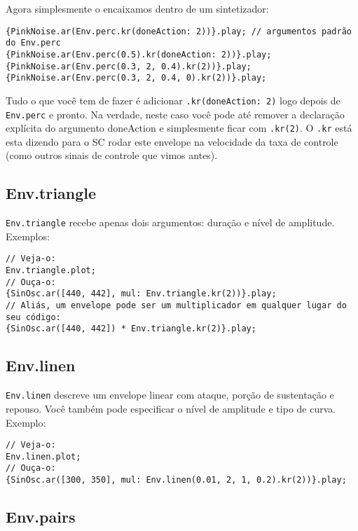 Agora simplesmente o encaixamos dentro de um sintetizador:

\begin{lstlisting}[style=SuperCollider-IDE, basicstyle=\scttfamily\footnotesize]
{PinkNoise.ar(Env.perc.kr(doneAction: 2))}.play; // argumentos padrão do Env.perc
{PinkNoise.ar(Env.perc(0.5).kr(doneAction: 2))}.play; 
{PinkNoise.ar(Env.perc(0.3, 2, 0.4).kr(2))}.play;
{PinkNoise.ar(Env.perc(0.3, 2, 0.4, 0).kr(2))}.play;
\end{lstlisting}
 
Tudo o que você tem de fazer é adicionar \texttt{.kr(doneAction: 2)} logo depois de \texttt{Env.perc} e pronto. Na verdade, neste caso você pode até remover a declaração explícita do argumento doneAction e simplesmente ficar com \texttt{.kr(2)}. O \texttt{.kr} está esta dizendo para o SC rodar este envelope na velocidade da taxa de controle (como outros sinais de controle que vimos antes).

\subsection{Env.triangle}

\texttt{Env.triangle} recebe apenas dois argumentos: duração e nível de amplitude. Exemplos:

 
\begin{lstlisting}[style=SuperCollider-IDE, basicstyle=\scttfamily\footnotesize]
// Veja-o:
Env.triangle.plot;
// Ouça-o:
{SinOsc.ar([440, 442], mul: Env.triangle.kr(2))}.play;
// Aliás, um envelope pode ser um multiplicador em qualquer lugar do seu código:
{SinOsc.ar([440, 442]) * Env.triangle.kr(2)}.play;
\end{lstlisting}

\subsection{Env.linen}

\texttt{Env.linen} descreve um envelope linear com ataque, porção de sustentação e repouso. Você também pode especificar o nível de amplitude e tipo de curva. Exemplo:

\begin{lstlisting}[style=SuperCollider-IDE, basicstyle=\scttfamily\footnotesize]
// Veja-o:
Env.linen.plot;
// Ouça-o:
{SinOsc.ar([300, 350], mul: Env.linen(0.01, 2, 1, 0.2).kr(2))}.play;
\end{lstlisting}

\subsection{Env.pairs}

